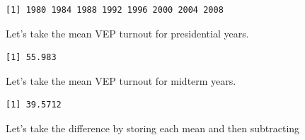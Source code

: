 \documentclass[
  letterpaper,
  DIV=11,
  numbers=noendperiod]{scrreprt}
\newenvironment{Shaded}{\begin{snugshade}}{\end{snugshade}}
\newcommand{\CommentTok}[1]{\textcolor[rgb]{0.37,0.37,0.37}{#1}}
\newcommand{\DecValTok}[1]{\textcolor[rgb]{0.68,0.00,0.00}{#1}}
\newcommand{\DocumentationTok}[1]{\textcolor[rgb]{0.37,0.37,0.37}{\textit{#1}}}
\newcommand{\FunctionTok}[1]{\textcolor[rgb]{0.28,0.35,0.67}{#1}}
\newcommand{\NormalTok}[1]{\textcolor[rgb]{0.00,0.23,0.31}{#1}}
\newcommand{\SpecialCharTok}[1]{\textcolor[rgb]{0.37,0.37,0.37}{#1}}
\begin{document}
\begin{Shaded}
\end{Shaded}

\begin{verbatim}
[1] 1980 1984 1988 1992 1996 2000 2004 2008
\end{verbatim}

Let's take the mean VEP turnout for presidential years.

\begin{Shaded}
\end{Shaded}

\begin{verbatim}
[1] 55.983
\end{verbatim}

Let's take the mean VEP turnout for midterm years.

\begin{Shaded}
\end{Shaded}

\begin{verbatim}
[1] 39.5712
\end{verbatim}

Let's take the difference by storing each mean and then subtracting
\end{document}
